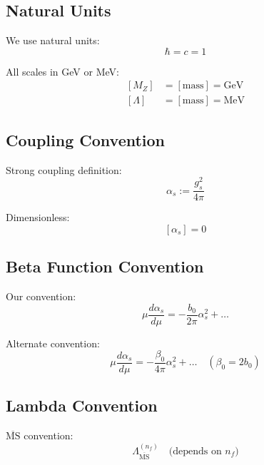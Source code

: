 \documentclass[11pt,a4paper]{article}
\theoremstyle{definition}
\begin{document}
\subsection{Natural Units}
\label{subsec:natural-units}

We use natural units:
\begin{equation}
\label{eq:app-natural}
\hbar = c = 1
\end{equation}

All scales in GeV or MeV:
\begin{align}
\label{eq:app-scales-gev}
[M_Z] &= [\text{mass}] = \text{GeV} \\
\label{eq:app-scales-mev}
[\Lambda] &= [\text{mass}] = \text{MeV}
\end{align}

\subsection{Coupling Convention}
\label{subsec:coupling-conv}

Strong coupling definition:
\begin{equation}
\label{eq:app-alpha-def}
\alpha_s := \frac{g_s^2}{4\pi}
\end{equation}

Dimensionless:
\begin{equation}
\label{eq:app-alpha-dim}
[\alpha_s] = 0
\end{equation}

\subsection{Beta Function Convention}
\label{subsec:beta-conv}

Our convention:
\begin{equation}
\label{eq:app-beta-conv}
\mu\frac{d\alpha_s}{d\mu} = -\frac{b_0}{2\pi}\alpha_s^2 + \ldots
\end{equation}

Alternate convention:
\begin{equation}
\label{eq:app-beta-alt}
\mu\frac{d\alpha_s}{d\mu} = -\frac{\beta_0}{4\pi}\alpha_s^2 + \ldots
  \quad (\beta_0 = 2b_0)
\end{equation}

\subsection{Lambda Convention}
\label{subsec:lambda-conv}

$\overline{\text{MS}}$ convention:
\begin{equation}
\label{eq:app-lambda-msbar}
\Lambda_{\overline{\text{MS}}}^{(n_f)} \quad \text{(depends on } n_f \text{)}
\end{equation}
\end{document}
